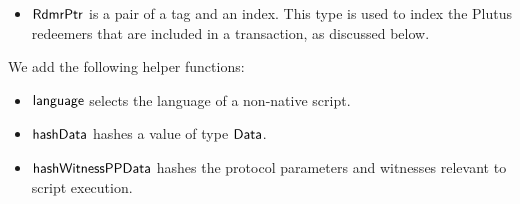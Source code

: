 \begin{itemize}
  \item $\mathsf{RdmrPtr}$ is a pair of a tag and an index. This type is
  used to index the Plutus redeemers that are included in a transaction, as discussed
  below.

\end{itemize}

We add the following helper functions:

\begin{itemize}
  \item $\mathsf{language}$ selects the language of a non-native script.
  \item $\mathsf{hashData}$ hashes a value of type $\mathsf{Data}$.
  \item $\mathsf{hashWitnessPPData}$ hashes the protocol parameters and witnesses relevant to script execution.
\end{itemize}

